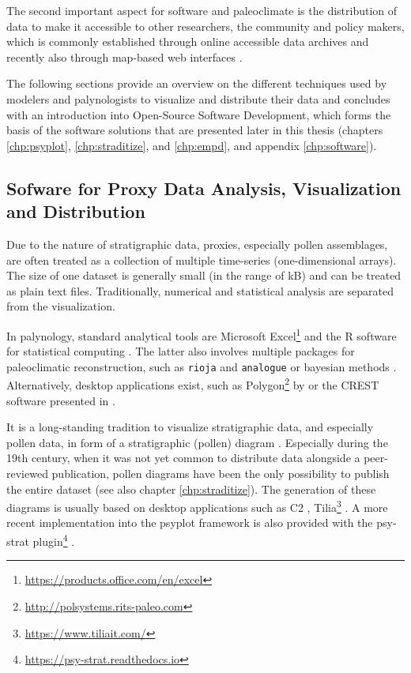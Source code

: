 \begin{refsection}
The second important aspect for software and paleoclimate is the distribution of data to make it accessible to other researchers, the community and policy makers, which is commonly established through online accessible data archives and recently also through map-based web interfaces \citep{WilliamsGrimmBloisEtAl2018, BollietBrockmannMassonDelmotteEtAl2016}.

The following sections provide an overview on the different techniques used by modelers and palynologists to visualize and distribute their data and concludes with an introduction into Open-Source Software Development, which forms the basis of the software solutions that are presented later in this thesis (chapters \ref{chp:psyplot}, \ref{chp:straditize}, and \ref{chp:empd}, and appendix \ref{chp:software}).

\subsection{Sofware for Proxy Data Analysis, Visualization and Distribution} \label{sec:intro-software-data}

Due to the nature of stratigraphic data, proxies, especially pollen assemblages, are often treated as a collection of multiple time-series (one-dimensional arrays). The size of one dataset is generally small (in the range of kB) and can be treated as plain text files. Traditionally, numerical and statistical analysis are separated from the visualization.

In palynology, standard analytical tools are Microsoft Excel\footnote{\url{https://products.office.com/en/excel}} and the R software for statistical computing \citep{RCT2019}. The latter also involves multiple packages for paleoclimatic reconstruction, such as \texttt{rioja} \citep{Juggins2017} and \texttt{analogue} \citep{SimpsonOksanen2019, Simpson2007} or bayesian methods \citep{NolanTiptonBoothEtAl2019, Tipton2017}. Alternatively, desktop applications exist, such as Polygon\footnote{\url{http://polsystems.rits-paleo.com}} by \cite{NakagawaTarasovNishidaEtAl2002} or the CREST software presented in \cite{ChevalierCheddadiChase2014, Chevalier2019}.

It is a long-standing tradition to visualize stratigraphic data, and especially pollen data, in form of a stratigraphic (pollen) diagram \citep{Bradley1985, Grimm1988}. Especially during the 19th century, when it was not yet common to distribute data alongside a peer-reviewed publication, pollen diagrams have been the only possibility to publish the entire dataset (see also chapter \ref{chp:straditize}). The generation of these diagrams is usually based on desktop applications such as C2 \citep{Juggins2007}, Tilia\footnote{\url{https://www.tiliait.com/}} \citep{Grimm1988, Grimm1991}. A more recent implementation into the psyplot framework \citep[chapter \ref{chp:psyplot}]{Sommer2017} is also provided with the psy-strat plugin\footnote{\url{https://psy-strat.readthedocs.io}} \citep{Sommer2019}.


\end{refsection}

